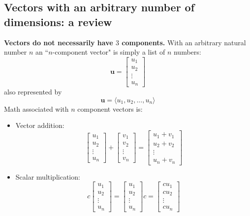 \documentclass{article}
\begin{document}
\subsection*{Vectors with an arbitrary number of dimensions: a review}

{\bf Vectors do not necessarily have \(3\) components.} With an arbitrary natural number \(n\) an ``\(n\)-component vector" is simply a list of \(n\) numbers:
\[\mathbf{u} = \begin{bmatrix} u_1 \\ u_2 \\ \vdots \\ u_n \end{bmatrix}\]
also represented by 
\[\mathbf{u} = \langle u_1, u_2, ..., u_n \rangle\]
Math associated with \(n\) component vectors is: 
\begin{itemize}
\item Vector addition:
\[\begin{bmatrix} u_1 \\ u_2 \\ \vdots \\ u_n \end{bmatrix} + \begin{bmatrix} v_1 \\ v_2 \\ \vdots \\ v_n \end{bmatrix} = \begin{bmatrix} u_1 + v_1 \\ u_2 + v_2 \\ \vdots \\ u_n + v_n \end{bmatrix}\]
\item Scalar multiplication:
\[c\begin{bmatrix} u_1 \\ u_2 \\ \vdots \\ u_n \end{bmatrix} = \begin{bmatrix} u_1 \\ u_2 \\ \vdots \\ u_n \end{bmatrix}c = \begin{bmatrix} c u_1 \\ c u_2 \\ \vdots \\ c u_n \end{bmatrix}\]

\end{itemize}
\end{document}
